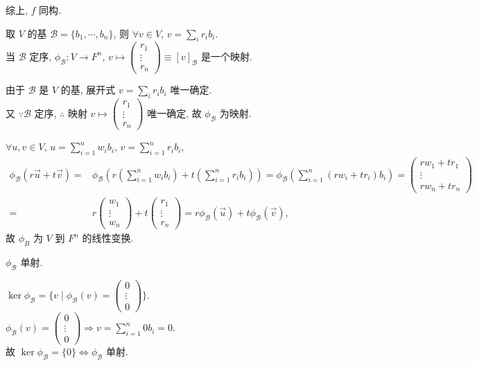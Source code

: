\documentclass{note}
\begin{document}
综上, $f$ 同构.

取 $V$ 的基 $\mathcal{B}=\{b_1,\cdots,b_n\}$, 则 $\forall v\in V$, $v=\sum_ir_ib_i$.\\
当 $\mathcal{B}$ 定序, $\phi_{\mathcal{B}}:V\rightarrow F^n$, $v\mapsto\begin{pmatrix}
    r_1\\
    \vdots\\
    r_n
\end{pmatrix}\equiv[v]_{\mathcal{B}}$ 是一个映射.
\begin{pf}
    由于 $\mathcal{B}$ 是 $V$ 的基, 展开式 $v=\sum_ir_ib_i$ 唯一确定.\\
    又 $\because\mathcal{B}$ 定序, $\therefore$ 映射 $v\mapsto\begin{pmatrix}
        r_1\\
        \vdots\\
        r_n
    \end{pmatrix}$ 唯一确定, 故 $\phi_{\mathcal{B}}$ 为映射.

    $\forall u,v\in V$, $u=\sum_{i=1}^nw_ib_i$, $v=\sum_{i=1}^nr_ib_i$,
    \begin{align*}
        \phi_{\mathcal{B}}(r\vec{u}+t\vec{v})=&\phi_{\mathcal{B}}\left(r\left(\sum_{i=1}^nw_ib_i\right)+t\left(\sum_{i=1}^nr_ib_i\right)\right)=\phi_{\mathcal{B}}\left(\sum_{i=1}^n(rw_i+tr_i)b_i\right)=\begin{pmatrix}
            rw_1+tr_1\\
            \vdots\\
            rw_n+tr_n
        \end{pmatrix}\\
        =&r\begin{pmatrix}
            w_1\\
            \vdots\\
            w_n
        \end{pmatrix}+t\begin{pmatrix}
            r_1\\
            \vdots\\
            r_n
        \end{pmatrix}=r\phi_{\mathcal{B}}(\vec{u})+t\phi_{\mathcal{B}}(\vec{v}),
    \end{align*}
    故 $\phi_B$ 为 $V$ 到 $F^n$ 的线性变换.
\end{pf}

$\phi_{\mathcal{B}}$ 单射.
\begin{pf}
    $\ker\phi_{\mathcal{B}}=\{v\mid\phi_{\mathcal{B}}(v)=\begin{pmatrix}
        0\\
        \vdots\\
        0
    \end{pmatrix}\}$.\\
    $\phi_{\mathcal{B}}(v)=\begin{pmatrix}
        0\\
        \vdots\\
        0
    \end{pmatrix}\Longrightarrow v=\sum_{i=1}^n0b_i=0$.\\
    故 $\ker\phi_{\mathcal{B}}=\{0\}\Longleftrightarrow\phi_{\mathcal{B}}$ 单射.
\end{pf}
\end{document}
